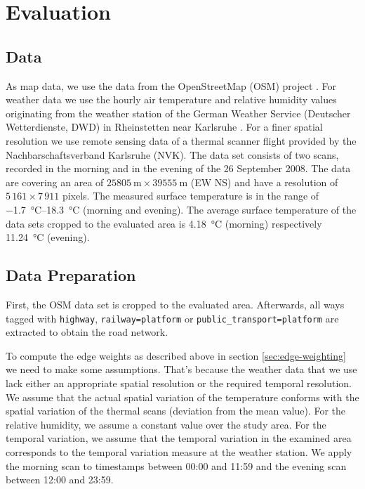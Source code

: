 
\section{Evaluation}

\subsection{Data}
\label{sec:data-sets}
As map data, we use the data from the OpenStreetMap (OSM) project \parencite{OSMF2016}. 
For weather data we use the hourly air temperature and relative humidity values originating from the weather station of the German Weather Service (Deutscher Wetterdienste, DWD) in Rheinstetten near Karlsruhe \parencite{DWD2016}. For a finer spatial resolution we use remote sensing data of a thermal scanner flight provided by the Nachbarschaftsverband Karlsruhe (NVK). The data set consists of two scans, recorded in the morning and in the evening of the 26 September 2008. The data are covering an area of  $\SI{25 805}{\meter} \times \SI{39 555}{\meter}$ (EW NS) and have a resolution of $5\,161 \times 7\,911$  pixels. The measured surface temperature is in the range of \SIrange{-1.7}{18.3}{\celsius} (morning and evening). The average surface temperature of the data sets cropped to the evaluated area is \SI{4.18}{\celsius} (morning) respectively \SI{11.24}{\celsius} (evening).  


\subsection{Data Preparation}
First, the OSM data set is cropped to the evaluated area. Afterwards, all ways tagged with \verb|highway|, \verb|railway=platform| or \verb|public_transport=platform| are extracted to obtain the road network.

To compute the edge weights as described above in section \ref{sec:edge-weighting} we need to make some assumptions. That's because the weather data that we use lack either an appropriate spatial resolution or the required temporal resolution. We assume that the actual spatial variation of the temperature conforms with the spatial variation of the thermal scans (deviation from the mean value). For the relative humidity, we assume a constant value over the study area. For the temporal variation, we assume that the temporal variation in the examined area corresponds to the temporal variation measure at the weather station. We apply the morning scan to timestamps between  00:00 and 11:59 and the evening scan between 12:00 and 23:59.

